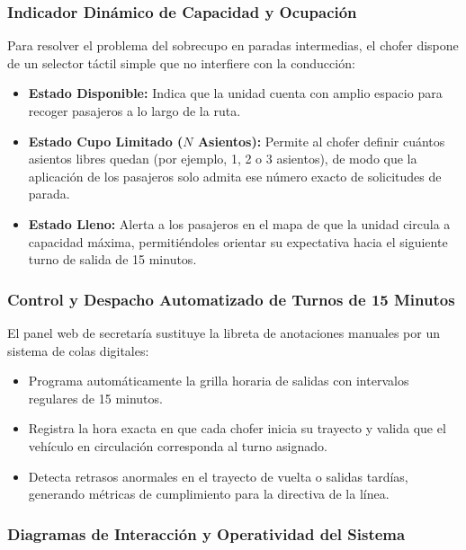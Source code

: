 \subsubsection{Indicador Dinámico de Capacidad y Ocupación}

Para resolver el problema del sobrecupo en paradas intermedias, el chofer dispone de un selector táctil simple que no interfiere con la conducción:

\begin{itemize}
    \item \textbf{Estado Disponible:} Indica que la unidad cuenta con amplio espacio para recoger pasajeros a lo largo de la ruta.
    \item \textbf{Estado Cupo Limitado ($N$ Asientos):} Permite al chofer definir cuántos asientos libres quedan (por ejemplo, 1, 2 o 3 asientos), de modo que la aplicación de los pasajeros solo admita ese número exacto de solicitudes de parada.
    \item \textbf{Estado Lleno:} Alerta a los pasajeros en el mapa de que la unidad circula a capacidad máxima, permitiéndoles orientar su expectativa hacia el siguiente turno de salida de 15 minutos.
\end{itemize}

\subsubsection{Control y Despacho Automatizado de Turnos de 15 Minutos}

El panel web de secretaría sustituye la libreta de anotaciones manuales por un sistema de colas digitales:

\begin{itemize}
    \item Programa automáticamente la grilla horaria de salidas con intervalos regulares de 15 minutos.
    \item Registra la hora exacta en que cada chofer inicia su trayecto y valida que el vehículo en circulación corresponda al turno asignado.
    \item Detecta retrasos anormales en el trayecto de vuelta o salidas tardías, generando métricas de cumplimiento para la directiva de la línea.
\end{itemize}

\subsubsection{Diagramas de Interacción y Operatividad del Sistema}


